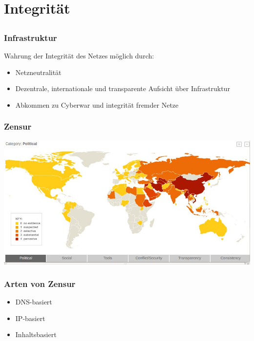 \documentclass[12pt]{beamer}
\begin{document}
\section{Integrität}
\subsection{}

\begin{frame}
    \frametitle{Infrastruktur}
    Wahrung der Integrität des Netzes möglich durch:
    \begin{itemize}
      \item<1-> Netzneutralität
      \item<2-> Dezentrale, internationale und transparente Aufsicht über Infrastruktur
      \item<3-> Abkommen zu Cyberwar und integrität fremder Netze
    \end{itemize}
\end{frame}

\begin{frame}
    \frametitle{Zensur}
    \includegraphics[height=0.7\textheight]{img/zensur-guardian.jpg}
\end{frame}

\begin{frame}
    \frametitle{Arten von Zensur}
    \begin{itemize}
      \item<1-> DNS-basiert
      \item<2-> IP-basiert
      \item<3-> Inhaltsbasiert
    \end{itemize}
\end{frame}
\end{document}
